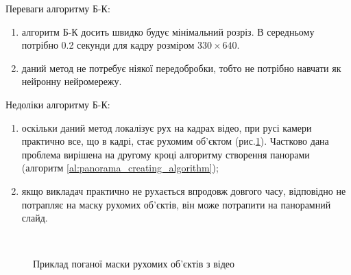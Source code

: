 Переваги алгоритму Б-К:
\begin{enumerate}
    \item алгоритм Б-К досить швидко будує мінімальний розріз. В середньому
          потрібно 0.2 секунди для кадру розміром $330 \times 640$.
    \item даний метод не потребує ніякої передобробки, тобто не потрібно навчати
          як нейронну нейромережу.
\end{enumerate}

Недоліки алгоритму Б-К:
\begin{enumerate}
    \item оскільки даний метод локалізує рух на кадрах відео,
          при русі камери практично все, що в кадрі, стає рухомим об'єктом
          (рис.\ref{fig:bk_bad_mask}).
          Частково дана проблема вирішена на другому кроці алгоритму створення панорами
          (алгоритм \ref{al:panorama_creating_algorithm});
    \item якщо викладач практично не рухається впродовж довгого часу, відповідно не потрапляє
          на маску рухомих об'єктів, він може потрапити на панорамний слайд.
\end{enumerate}

\begin{figure}[H]
    \centering

     \\
    \caption{Приклад поганої маски рухомих об'єктів з відео \cite{video:dorohovtsev_spetskurs_vesna}
        \label{fig:bk_bad_mask}
    }
\end{figure}

